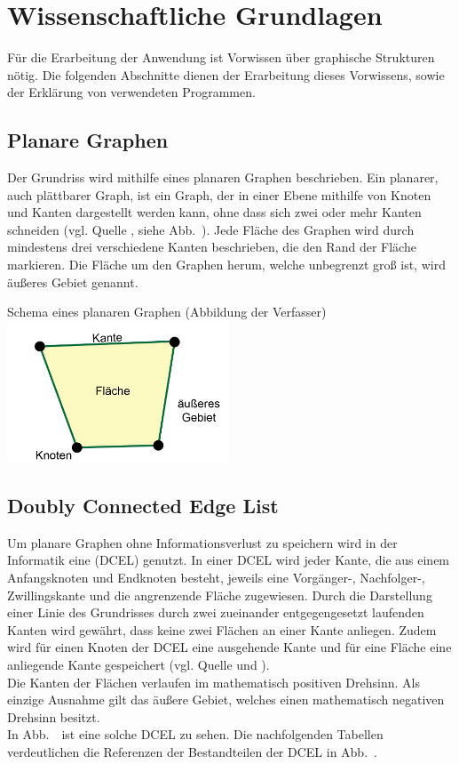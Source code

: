 \chapter{Wissenschaftliche Grundlagen}
Für die Erarbeitung der Anwendung ist Vorwissen über graphische Strukturen nötig.
Die folgenden Abschnitte dienen der Erarbeitung dieses Vorwissens, sowie der Erklärung von verwendeten Programmen.

\section{Planare Graphen}
Der Grundriss wird mithilfe eines planaren Graphen beschrieben.               
Ein planarer, auch plättbarer Graph, ist ein Graph, der in einer Ebene mithilfe von Knoten und Kanten dargestellt werden kann, ohne dass sich zwei oder mehr Kanten schneiden (vgl. Quelle \cite{planarGraph}, siehe Abb.~\thebildnrnext). 
Jede Fläche des Graphen wird durch mindestens drei verschiedene Kanten beschrieben, die den Rand der Fläche markieren. 
Die Fläche um den Graphen herum, welche unbegrenzt groß ist, wird äußeres Gebiet genannt. \\

\begin{Bild}{Schema eines planaren Graphen (Abbildung der Verfasser)}
	\includegraphics[width = 250px]{Bilder/planarerGraph-11}
\end{Bild}

\section{Doubly Connected Edge List}
Um planare Graphen ohne Informationsverlust zu speichern wird in der Informatik eine  (DCEL) genutzt.
In einer DCEL wird jeder Kante, die aus einem Anfangsknoten und Endknoten besteht, jeweils eine Vorgänger-, Nachfolger-, Zwillingskante und die angrenzende Fläche zugewiesen. 
Durch die Darstellung einer Linie des Grundrisses durch zwei zueinander entgegengesetzt laufenden Kanten wird gewährt, dass keine zwei Flächen an einer Kante anliegen.
Zudem wird für einen Knoten der DCEL eine ausgehende Kante und für eine Fläche eine anliegende Kante gespeichert (vgl. Quelle \cite{dcel} und \cite{dcelwiki}). \\
Die Kanten der Flächen verlaufen im mathematisch positiven Drehsinn.
Als einzige Ausnahme gilt das äußere Gebiet, welches einen mathematisch negativen Drehsinn besitzt. \\
In Abb.~\thebildnrnext\ ist eine solche DCEL zu sehen.
Die nachfolgenden Tabellen verdeutlichen die Referenzen der Bestandteilen der DCEL in Abb.~\thebildnrnext.\\


